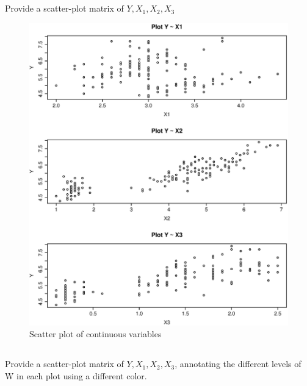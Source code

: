\documentclass{article}
\begin{document}
\subsection{}
Provide a scatter-plot matrix of $Y, X_1, X_2, X_3$
  \begin{figure}[H]
  \centering
  \includegraphics[scale=0.6]{scatter.eps}
  \caption{Scatter plot of continuous variables}
  \label{fig:scatter}
  \end{figure}

\subsection{}
Provide a scatter-plot matrix of $Y, X_1, X_2, X_3$, annotating the different
levels of W in each plot using a different color.
\end{document}
